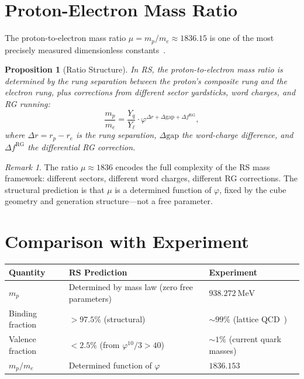 \documentclass[12pt,a4paper]{article}
\newtheorem{proposition}[theorem]{Proposition}
\theoremstyle{definition}
\theoremstyle{remark}
\newtheorem{remark}[theorem]{Remark}
\begin{document}
\section{Proton-Electron Mass Ratio}
\label{sec:ratio}

The proton-to-electron mass ratio
$\mu = m_p/m_e \approx 1836.15$ is one of the most precisely
measured dimensionless constants~\cite{CODATA}.

\begin{proposition}[Ratio Structure]
\label{prop:ratio}
In RS, the proton-to-electron mass ratio is determined by the
rung separation between the proton's composite rung and the
electron rung, plus corrections from different sector yardsticks,
word charges, and RG running:
\begin{equation}
  \frac{m_p}{m_e} = \frac{Y_q}{Y_\ell} \cdot
  \varphi^{\Delta r + \Delta\mathrm{gap}
  + \Delta f^{\mathrm{RG}}},
\end{equation}
where $\Delta r = r_p - r_e$ is the rung separation,
$\Delta\mathrm{gap}$ the word-charge difference, and
$\Delta f^{\mathrm{RG}}$ the differential RG correction.
\end{proposition}

\begin{remark}
The ratio $\mu \approx 1836$ encodes the full complexity
of the RS mass framework: different sectors, different word
charges, different RG corrections.  The structural
prediction is that $\mu$ is a determined function of $\varphi$,
fixed by the cube geometry and generation structure---not a
free parameter.
\end{remark}

\section{Comparison with Experiment}
\label{sec:comparison}

\begin{center}
\renewcommand{\arraystretch}{1.3}
\begin{tabular}{lp{5cm}p{5cm}}
\toprule
\textbf{Quantity} & \textbf{RS Prediction} &
  \textbf{Experiment} \\
\midrule
$m_p$ & Determined by mass law (zero free parameters)
  & $938.272~\mathrm{MeV}$~\cite{PDG} \\
Binding fraction & $> 97.5\%$ (structural)
  & $\sim 99\%$ (lattice QCD~\cite{LatticeQCD}) \\
Valence fraction & $< 2.5\%$ (from $\varphi^{10}/3 > 40$)
  & $\sim 1\%$ (current quark masses) \\
$m_p/m_e$ & Determined function of $\varphi$
  & $1836.153$~\cite{CODATA} \\
\bottomrule
\end{tabular}
\end{center}
\end{document}
